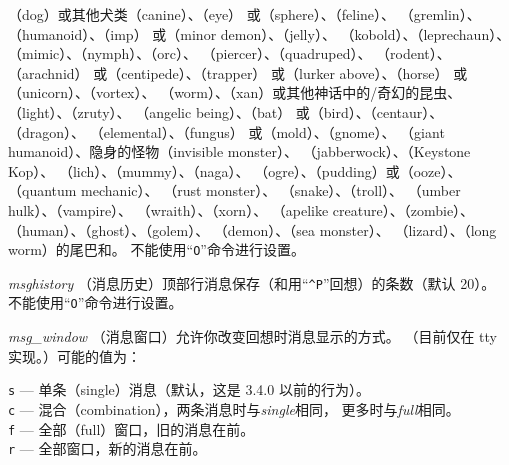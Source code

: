 \documentclass[a4paper, 10pt]{article}
\newcommand{\ib}[1]{\it #1 \hfill}
\begin{document}
\zhTransDog（dog）或其他犬类（canine）、\zhTransEye（eye）
或\zhTransSphere（sphere）、\zhTransFeline（feline）、
\zhTransGremlin（gremlin）、\zhTransHumanoid（humanoid）、\zhTransImp（imp）
或\zhTransMinorDemon（minor demon）、\zhTransJellies（jelly）、
\zhTransKobold（kobold）、\zhTransLeprechaun（leprechaun）、
\zhTransMimic（mimic）、\zhTransNymph（nymph）、\zhTransOrcs（orc）、
\zhTransPiercer（piercer）、\zhTransQuadruped（quadruped）、
\zhTransRodent（rodent）、\zhTransArachnid（arachnid）
或\zhTransCentipede（centipede）、\zhTransTrapper（trapper）
或\zhTransLurkerAbove（lurker above）、\zhTransHorse（horse）
或\zhTransUnicorn（unicorn）、\zhTransVortex（vortex）、
\zhTransWorm（worm）、\zhTransXan（xan）或其他神话中的/奇幻的昆虫、
\zhTransLight（light）、\zhTransZruty（zruty）、
\zhTransAngelicBeing（angelic being）、\zhTransBat（bat）
或\zhTransBird（bird）、\zhTransCentaur（centaur）、\zhTransDragon（dragon）、
\zhTransElemental（elemental）、\zhTransFungi（fungus）
或\zhTransMold（mold）、\zhTransGnomes（gnome）、
\zhTransGiantHumanoid（giant humanoid）、隐身的怪物（invisible monster）、
\zhTransJabberwock（jabberwock）、\zhTransKeystoneKop（Keystone Kop）、
\zhTransLich（lich）、\zhTransMummy（mummy）、\zhTransNaga（naga）、
\zhTransOrge（ogre）、\zhTransPudding（pudding）或\zhTransOoze（ooze）、
\zhTransQuantumMechanic（quantum mechanic）、
\zhTransRustMonster（rust monster）、
\zhTransSnake（snake）、\zhTransTroll（troll）、
\zhTransUmberHulk（umber hulk）、\zhTransVampire（vampire）、
\zhTransWraith（wraith）、\zhTransXorn（xorn）、
\zhTransApelikeCreature（apelike creature）、\zhTransZombie（zombie）、
\zhTransHumans（human）、\zhTransGhosts（ghost）、\zhTransGolem（golem）、
\zhTransDemons（demon）、\zhTransSeaMonster（sea monster）、
\zhTransLizard（lizard）、\zhTransLongWorm（long worm）的尾巴和\zhTransMimic。
不能使用“{\tt O}”命令进行设置。

\item[\ib{msghistory}]
（消息历史）顶部行消息保存（和用“{\tt \^{}P}”回想）的条数（默认 20）。
不能使用“{\tt O}”命令进行设置。
\item[\ib{msg\_window}]
（消息窗口）允许你改变回想时消息显示的方式。
（目前仅在 tty 实现。）可能的值为：

{\tt s} --- 单条（single）消息（默认，这是 3.4.0 以前的行为）。\\
{\tt c} --- 混合（combination），两条消息时与{\it single\/}相同，
更多时与{\it full\/}相同。\\
{\tt f} --- 全部（full）窗口，旧的消息在前。\\
{\tt r} --- 全部窗口，新的消息在前。
\end{document}
